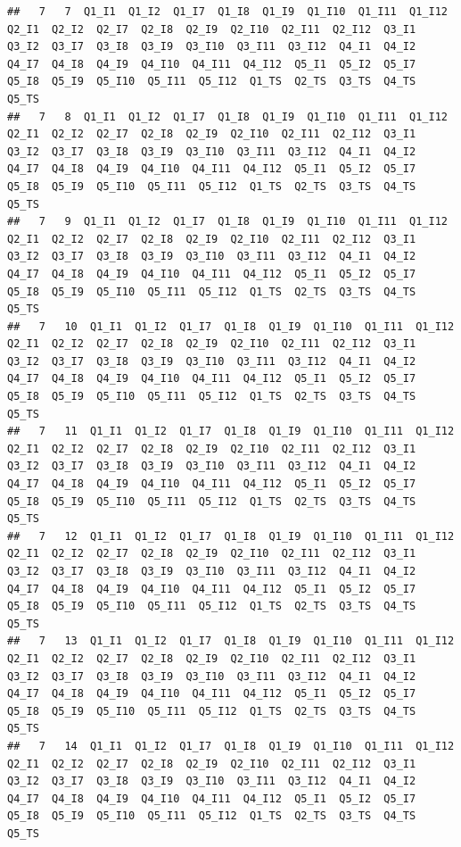 \documentclass[
]{book}
\begin{document}
\begin{verbatim}
##   7   7  Q1_I1  Q1_I2  Q1_I7  Q1_I8  Q1_I9  Q1_I10  Q1_I11  Q1_I12  Q2_I1  Q2_I2  Q2_I7  Q2_I8  Q2_I9  Q2_I10  Q2_I11  Q2_I12  Q3_I1  Q3_I2  Q3_I7  Q3_I8  Q3_I9  Q3_I10  Q3_I11  Q3_I12  Q4_I1  Q4_I2  Q4_I7  Q4_I8  Q4_I9  Q4_I10  Q4_I11  Q4_I12  Q5_I1  Q5_I2  Q5_I7  Q5_I8  Q5_I9  Q5_I10  Q5_I11  Q5_I12  Q1_TS  Q2_TS  Q3_TS  Q4_TS  Q5_TS
##   7   8  Q1_I1  Q1_I2  Q1_I7  Q1_I8  Q1_I9  Q1_I10  Q1_I11  Q1_I12  Q2_I1  Q2_I2  Q2_I7  Q2_I8  Q2_I9  Q2_I10  Q2_I11  Q2_I12  Q3_I1  Q3_I2  Q3_I7  Q3_I8  Q3_I9  Q3_I10  Q3_I11  Q3_I12  Q4_I1  Q4_I2  Q4_I7  Q4_I8  Q4_I9  Q4_I10  Q4_I11  Q4_I12  Q5_I1  Q5_I2  Q5_I7  Q5_I8  Q5_I9  Q5_I10  Q5_I11  Q5_I12  Q1_TS  Q2_TS  Q3_TS  Q4_TS  Q5_TS
##   7   9  Q1_I1  Q1_I2  Q1_I7  Q1_I8  Q1_I9  Q1_I10  Q1_I11  Q1_I12  Q2_I1  Q2_I2  Q2_I7  Q2_I8  Q2_I9  Q2_I10  Q2_I11  Q2_I12  Q3_I1  Q3_I2  Q3_I7  Q3_I8  Q3_I9  Q3_I10  Q3_I11  Q3_I12  Q4_I1  Q4_I2  Q4_I7  Q4_I8  Q4_I9  Q4_I10  Q4_I11  Q4_I12  Q5_I1  Q5_I2  Q5_I7  Q5_I8  Q5_I9  Q5_I10  Q5_I11  Q5_I12  Q1_TS  Q2_TS  Q3_TS  Q4_TS  Q5_TS
##   7   10  Q1_I1  Q1_I2  Q1_I7  Q1_I8  Q1_I9  Q1_I10  Q1_I11  Q1_I12  Q2_I1  Q2_I2  Q2_I7  Q2_I8  Q2_I9  Q2_I10  Q2_I11  Q2_I12  Q3_I1  Q3_I2  Q3_I7  Q3_I8  Q3_I9  Q3_I10  Q3_I11  Q3_I12  Q4_I1  Q4_I2  Q4_I7  Q4_I8  Q4_I9  Q4_I10  Q4_I11  Q4_I12  Q5_I1  Q5_I2  Q5_I7  Q5_I8  Q5_I9  Q5_I10  Q5_I11  Q5_I12  Q1_TS  Q2_TS  Q3_TS  Q4_TS  Q5_TS
##   7   11  Q1_I1  Q1_I2  Q1_I7  Q1_I8  Q1_I9  Q1_I10  Q1_I11  Q1_I12  Q2_I1  Q2_I2  Q2_I7  Q2_I8  Q2_I9  Q2_I10  Q2_I11  Q2_I12  Q3_I1  Q3_I2  Q3_I7  Q3_I8  Q3_I9  Q3_I10  Q3_I11  Q3_I12  Q4_I1  Q4_I2  Q4_I7  Q4_I8  Q4_I9  Q4_I10  Q4_I11  Q4_I12  Q5_I1  Q5_I2  Q5_I7  Q5_I8  Q5_I9  Q5_I10  Q5_I11  Q5_I12  Q1_TS  Q2_TS  Q3_TS  Q4_TS  Q5_TS
##   7   12  Q1_I1  Q1_I2  Q1_I7  Q1_I8  Q1_I9  Q1_I10  Q1_I11  Q1_I12  Q2_I1  Q2_I2  Q2_I7  Q2_I8  Q2_I9  Q2_I10  Q2_I11  Q2_I12  Q3_I1  Q3_I2  Q3_I7  Q3_I8  Q3_I9  Q3_I10  Q3_I11  Q3_I12  Q4_I1  Q4_I2  Q4_I7  Q4_I8  Q4_I9  Q4_I10  Q4_I11  Q4_I12  Q5_I1  Q5_I2  Q5_I7  Q5_I8  Q5_I9  Q5_I10  Q5_I11  Q5_I12  Q1_TS  Q2_TS  Q3_TS  Q4_TS  Q5_TS
##   7   13  Q1_I1  Q1_I2  Q1_I7  Q1_I8  Q1_I9  Q1_I10  Q1_I11  Q1_I12  Q2_I1  Q2_I2  Q2_I7  Q2_I8  Q2_I9  Q2_I10  Q2_I11  Q2_I12  Q3_I1  Q3_I2  Q3_I7  Q3_I8  Q3_I9  Q3_I10  Q3_I11  Q3_I12  Q4_I1  Q4_I2  Q4_I7  Q4_I8  Q4_I9  Q4_I10  Q4_I11  Q4_I12  Q5_I1  Q5_I2  Q5_I7  Q5_I8  Q5_I9  Q5_I10  Q5_I11  Q5_I12  Q1_TS  Q2_TS  Q3_TS  Q4_TS  Q5_TS
##   7   14  Q1_I1  Q1_I2  Q1_I7  Q1_I8  Q1_I9  Q1_I10  Q1_I11  Q1_I12  Q2_I1  Q2_I2  Q2_I7  Q2_I8  Q2_I9  Q2_I10  Q2_I11  Q2_I12  Q3_I1  Q3_I2  Q3_I7  Q3_I8  Q3_I9  Q3_I10  Q3_I11  Q3_I12  Q4_I1  Q4_I2  Q4_I7  Q4_I8  Q4_I9  Q4_I10  Q4_I11  Q4_I12  Q5_I1  Q5_I2  Q5_I7  Q5_I8  Q5_I9  Q5_I10  Q5_I11  Q5_I12  Q1_TS  Q2_TS  Q3_TS  Q4_TS  Q5_TS

\end{verbatim}
\end{document}

